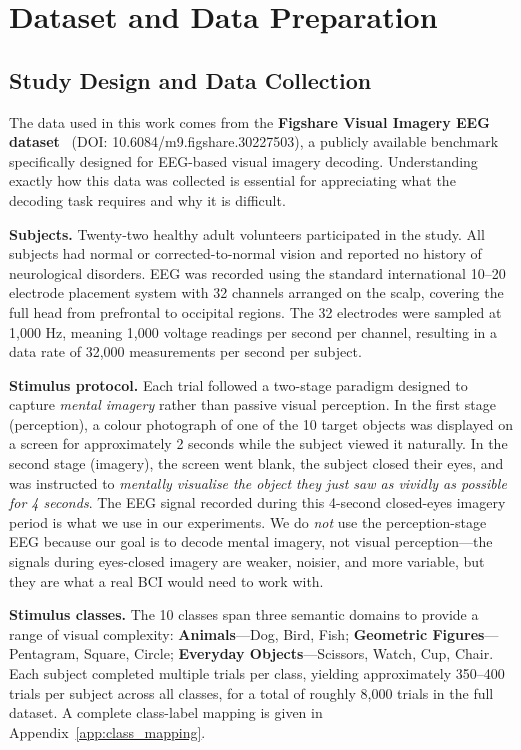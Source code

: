 \documentclass{article}
\begin{document}
\section{Dataset and Data Preparation}

\subsection{Study Design and Data Collection}

The data used in this work comes from the \textbf{Figshare Visual Imagery EEG dataset}~\citep{figshare_eeg} (DOI: 10.6084/m9.figshare.30227503), a publicly available benchmark specifically designed for EEG-based visual imagery decoding. Understanding exactly how this data was collected is essential for appreciating what the decoding task requires and why it is difficult.

\textbf{Subjects.} Twenty-two healthy adult volunteers participated in the study. All subjects had normal or corrected-to-normal vision and reported no history of neurological disorders. EEG was recorded using the standard international 10--20 electrode placement system with 32 channels arranged on the scalp, covering the full head from prefrontal to occipital regions. The 32 electrodes were sampled at 1,000 Hz, meaning 1,000 voltage readings per second per channel, resulting in a data rate of 32,000 measurements per second per subject.

\textbf{Stimulus protocol.} Each trial followed a two-stage paradigm designed to capture \emph{mental imagery} rather than passive visual perception. In the first stage (perception), a colour photograph of one of the 10 target objects was displayed on a screen for approximately 2 seconds while the subject viewed it naturally. In the second stage (imagery), the screen went blank, the subject closed their eyes, and was instructed to \emph{mentally visualise the object they just saw as vividly as possible for 4 seconds}. The EEG signal recorded during this 4-second closed-eyes imagery period is what we use in our experiments. We do \emph{not} use the perception-stage EEG because our goal is to decode mental imagery, not visual perception---the signals during eyes-closed imagery are weaker, noisier, and more variable, but they are what a real BCI would need to work with.

\textbf{Stimulus classes.} The 10 classes span three semantic domains to provide a range of visual complexity: \textbf{Animals}---Dog, Bird, Fish; \textbf{Geometric Figures}---Pentagram, Square, Circle; \textbf{Everyday Objects}---Scissors, Watch, Cup, Chair. Each subject completed multiple trials per class, yielding approximately 350--400 trials per subject across all classes, for a total of roughly 8,000 trials in the full dataset. A complete class-label mapping is given in Appendix~\ref{app:class_mapping}.
\end{document}
